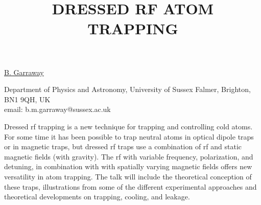\title{DRESSED RF ATOM TRAPPING}

\underline{B. Garraway}


Department of Physics and Astronomy,
University of Sussex
Falmer, Brighton, BN1 9QH,
UK\\
email: b.m.garraway@sussex.ac.uk

Dressed rf trapping is a new technique for
trapping and controlling cold atoms. For some time it
has been possible to trap neutral atoms in optical
dipole traps or in magnetic traps, but dressed rf traps
use a combination of rf and static magnetic fields
(with gravity). The rf with variable frequency,
polarization, and detuning, in combination with with
spatially varying magnetic fields offers new
versatility in atom trapping.
The talk will include the theoretical conception of
these traps, illustrations from some of the different
experimental approaches and theoretical developments on
trapping, cooling, and leakage.

\vspace{\baselineskip}